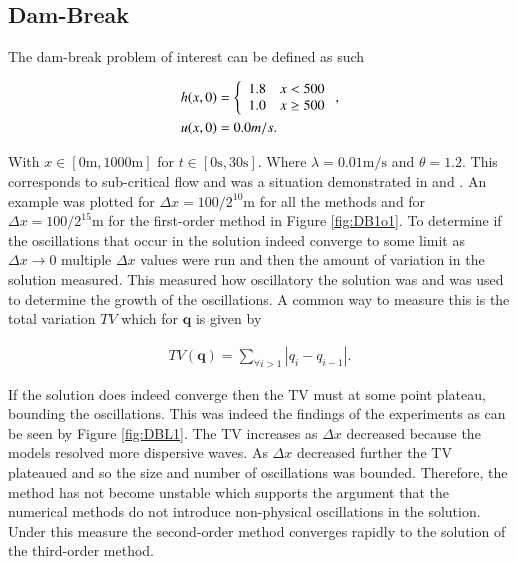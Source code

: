 \documentclass[SingleSpace,12pt,Proceedings]{Serre_ASCE}
\begin{document}
\subsection{Dam-Break}
The dam-break problem of interest can be defined as such
\begin{linenomath*}
\begin{gather*}
\begin{split}
h(x,0) &= \left\lbrace \begin{array}{c c}
1.8 & x < 500\\
1.0 & x \ge 500\\
\end{array} \right. ,\\
u(x,0) &= 0.0m/s.
\end{split}
\end{gather*}
\end{linenomath*}
With $x \in \left[0\text{m},1000\text{m}\right]$ for $t \in \left[0\text{s},30\text{s}\right]$. Where $\lambda = 0.01 \text{m/s}$ and $\theta = 1.2$. This corresponds to sub-critical flow and was a situation demonstrated in  and . An example was plotted for $\Delta x = 100 /2^{10}\text{m}$ for all the methods and for $\Delta x = 100 /2^{15}\text{m}$ for the first-order method in Figure \ref{fig:DB1o1}. To determine if the oscillations that occur in the solution indeed converge to some limit as $\Delta x \rightarrow 0$ multiple $\Delta x$ values were run and then the amount of variation in the solution measured. This measured how oscillatory the solution was and was used to determine the growth of the oscillations. A common way to measure this is the total variation $TV$ \cite{LeVeque-2002} which for $\boldsymbol{q}$ is given by
\begin{linenomath*}
\begin{gather*}
TV(\boldsymbol{q}) = \sum_{\forall i >1} |q_{i} - q_{i-1}|.
\end{gather*}
\end{linenomath*}
If the solution does indeed converge then the TV must at some point plateau, bounding the oscillations. This was indeed the findings of the experiments as can be seen by Figure \ref{fig:DBL1}. The TV increases as $\Delta x$ decreased because the models resolved more dispersive waves. As $\Delta x$ decreased further the TV plateaued and so the size and number of oscillations was bounded. Therefore, the method has not become unstable which supports the argument that the numerical methods do not introduce non-physical oscillations in the solution. Under this measure the second-order method converges rapidly to the solution of the third-order method.
\end{document}

